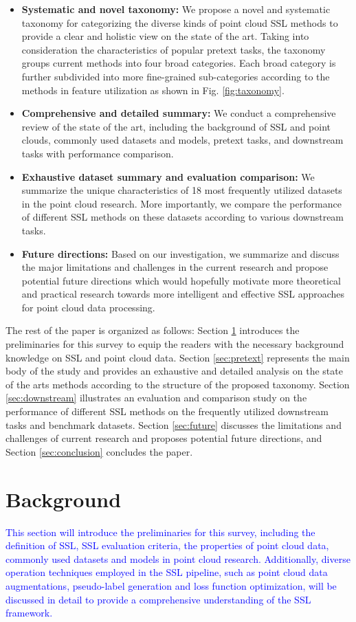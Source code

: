 \documentclass[a4paper,fleqn]{cas-dc}
\begin{document}
\begin{itemize}
    \item \textbf{Systematic and novel taxonomy:}
    We propose a novel and systematic taxonomy for categorizing the diverse kinds of point cloud SSL methods to provide a clear and holistic view on the state of the art. Taking into consideration the characteristics of popular pretext tasks, the taxonomy groups current methods into four broad categories. Each broad category is further subdivided into more fine-grained sub-categories according to the methods in feature utilization as shown in Fig. \ref{fig:taxonomy}.
    \item \textbf{Comprehensive and detailed summary:}
    We conduct a comprehensive review of the state of the art, including the background of SSL and point clouds, commonly used datasets and models, pretext tasks, and downstream tasks with performance comparison.
    \item \textbf{Exhaustive dataset summary and evaluation comparison:}
    We summarize the unique characteristics of 18 most frequently utilized datasets in the point cloud research. More importantly, we compare the performance of different SSL methods on these datasets according to various downstream tasks.
    \item \textbf{Future directions:}
    Based on our investigation, we summarize and discuss the major limitations and challenges in the current research and propose potential future directions which would hopefully motivate more theoretical and practical research towards more intelligent and effective SSL approaches for point cloud data processing.
\end{itemize}

The rest of the paper is organized as follows: Section \ref{sec:background} introduces the preliminaries for this survey to equip the readers with the necessary background knowledge on SSL and point cloud data. Section \ref{sec:pretext} represents the main body of the study and provides an exhaustive and detailed analysis on the state of the arts methods according to the structure of the proposed taxonomy. Section \ref{sec:downstream} illustrates an evaluation and comparison study on the performance of different SSL methods on the frequently utilized downstream tasks and benchmark datasets. Section \ref{sec:future} discusses the limitations and challenges of current research and proposes potential future directions, and Section \ref{sec:conclusion} concludes the paper.

\section{Background} \label{sec:background}
\textcolor{blue}{
This section will introduce the preliminaries for this survey, including the definition of SSL, SSL evaluation criteria, the properties of point cloud data, commonly used datasets and models in point cloud research. Additionally, diverse operation techniques employed in the SSL pipeline, such as point cloud data augmentations, pseudo-label generation and loss function optimization, will be discussed in detail to provide a comprehensive understanding of the SSL framework.
}
\end{document}
